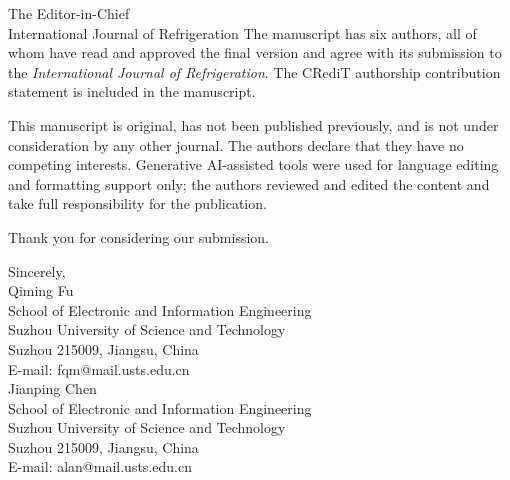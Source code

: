 \documentclass[11pt]{letter}
\begin{document}
\begin{letter}{The Editor-in-Chief\\International Journal of Refrigeration}
The manuscript has six authors, all of whom have read and approved the final version and agree with its submission to the \textit{International Journal of Refrigeration}. The CRediT authorship contribution statement is included in the manuscript.

This manuscript is original, has not been published previously, and is not under consideration by any other journal. The authors declare that they have no competing interests. Generative AI-assisted tools were used for language editing and formatting support only; the authors reviewed and edited the content and take full responsibility for the publication.

Thank you for considering our submission.

\vspace{2\baselineskip}
\noindent Sincerely,\\[2\baselineskip]
Qiming Fu\\
School of Electronic and Information Engineering\\
Suzhou University of Science and Technology\\
Suzhou 215009, Jiangsu, China\\
E-mail: fqm@mail.usts.edu.cn\\[1\baselineskip]
Jianping Chen\\
School of Electronic and Information Engineering\\
Suzhou University of Science and Technology\\
Suzhou 215009, Jiangsu, China\\
E-mail: alan@mail.usts.edu.cn

\end{letter}
\end{document}
